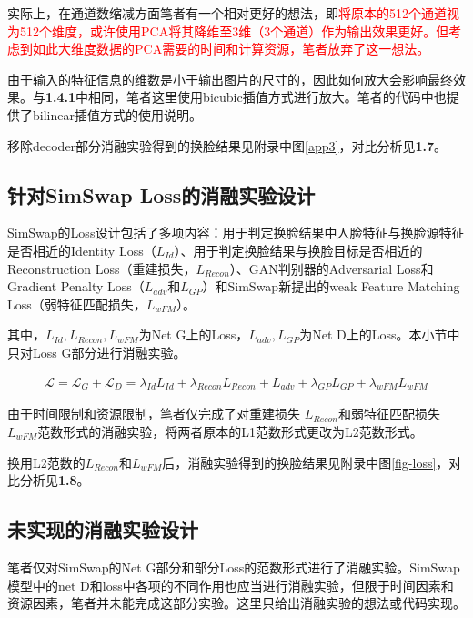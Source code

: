 \documentclass[a4paper]{article}
\begin{document}
实际上，在通道数缩减方面笔者有一个相对更好的想法，即\textcolor{red}{将原本的512个通道视为512个维度，或许使用PCA将其降维至3维（3个通道）作为输出效果更好。但考虑到如此大维度数据的PCA需要的时间和计算资源，笔者放弃了这一想法。}

由于输入的特征信息的维数是小于输出图片的尺寸的，因此如何放大会影响最终效果。与\textbf{1.4.1}中相同，笔者这里使用bicubic插值方式进行放大。笔者的代码中也提供了bilinear插值方式的使用说明。

移除decoder部分消融实验得到的换脸结果见附录中图\ref{app3}，对比分析见\textbf{1.7}。

\subsection{针对SimSwap Loss的消融实验设计}

SimSwap的Loss设计包括了多项内容：用于判定换脸结果中人脸特征与换脸源特征是否相近的Identity Loss（$L_{Id}$）、用于判定换脸结果与换脸目标是否相近的Reconstruction Loss（重建损失，$L_{Recon}$）、GAN判别器的Adversarial Loss和Gradient Penalty Loss（$L_{adv}$和$L_{GP}$）和SimSwap新提出的weak Feature Matching Loss（弱特征匹配损失，$L_{wFM}$）。

其中，$L_{Id}, L_{Recon}, L_{wFM}$为Net G上的Loss，$L_{adv}, L_{GP}$为Net D上的Loss。本小节中只对Loss G部分进行消融实验。

    \vspace{-2.2em}
    \begin{align*}
        \mathcal{L}=\mathcal{L}_G+\mathcal{L}_D=\lambda_{Id}L_{Id} + \lambda_{Recon}L_{Recon} + L_{adv} + \lambda_{GP}L_{GP} + \lambda_{wFM}L_{wFM}
    \end{align*}
    
\vspace{-0.5em}
由于时间限制和资源限制，笔者仅完成了对重建损失 $L_{Recon}$和弱特征匹配损失 $L_{wFM}$范数形式的消融实验，将两者原本的L1范数形式更改为L2范数形式。

换用L2范数的$L_{Recon}$和$L_{wFM}$后，消融实验得到的换脸结果见附录中图\ref{fig-loss}，对比分析见\textbf{1.8}。

\subsection{未实现的消融实验设计}

笔者仅对SimSwap的Net G部分和部分Loss的范数形式进行了消融实验。SimSwap模型中的net D和loss中各项的不同作用也应当进行消融实验，但限于时间因素和资源因素，笔者并未能完成这部分实验。这里只给出消融实验的想法或代码实现。
\end{document}
